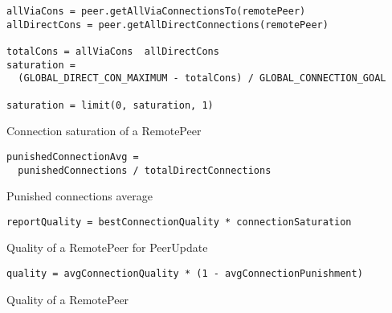 \begin{Listing}[H]
\begin{lstlisting}[xleftmargin=3em]
allViaCons = peer.getAllViaConnectionsTo(remotePeer)
allDirectCons = peer.getAllDirectConnections(remotePeer)

totalCons = allViaCons  allDirectCons
saturation = 
  (GLOBAL_DIRECT_CON_MAXIMUM - totalCons) / GLOBAL_CONNECTION_GOAL

saturation = limit(0, saturation, 1)
\end{lstlisting}
\label{lst:mit-connection-saturation}
\caption{Connection saturation of a RemotePeer}
\end{Listing}

\begin{Listing}[H]
\begin{lstlisting}[xleftmargin=3em]
punishedConnectionAvg = 
  punishedConnections / totalDirectConnections
\end{lstlisting}
\label{lst:mit-punished-conenctions}
\caption{Punished connections average}
\end{Listing}

\begin{Listing}[H]
\begin{lstlisting}[xleftmargin=3em]
reportQuality = bestConnectionQuality * connectionSaturation
\end{lstlisting}
\label{lst:mit-remote-peer-quality-report}
\caption{Quality of a RemotePeer for PeerUpdate}
\end{Listing}

\begin{Listing}[H]
\begin{lstlisting}[xleftmargin=3em]
quality = avgConnectionQuality * (1 - avgConnectionPunishment)
\end{lstlisting}
\label{lst:mit-remote-peer-quality}
\caption{Quality of a RemotePeer}
\end{Listing}